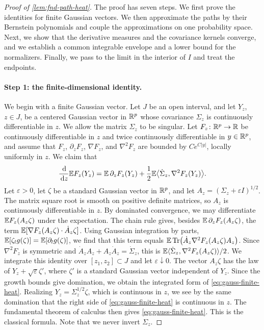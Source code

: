 \begin{proof}[Proof of \cref{lem:fnd-path-heat}]
The proof has seven steps. We first prove the identities for finite
Gaussian vectors. We then approximate the paths by their Bernstein
polynomials and couple the approximations on one probability space.
Next, we show that the derivative measures and the covariance kernels
converge, and we establish a common integrable envelope and a lower
bound for the normalizers. Finally, we pass to the limit in the interior
of $I$ and treat the endpoints.

\paragraph{Step 1: the finite-dimensional identity.}
We begin with a finite Gaussian vector. Let $J$ be an open interval,
and let $Y_z$, $z\in J$, be a centered Gaussian vector in $\mathbb R^p$ whose
covariance $\Sigma_z$ is continuously differentiable in $z$. We allow the
matrix $\Sigma_z$ to be
singular. Let $F_z\colon\mathbb R^p\to\mathbb R$ be continuously
differentiable in $z$ and twice continuously differentiable in
$y\in\mathbb R^p$, and assume that $F_z$, $\partial_zF_z$, $\nabla F_z$, and
$\nabla^2F_z$ are bounded by $Ce^{C|y|}$, locally uniformly in $z$. We
claim that
\begin{equation}\label{eq:gauss-finite-heat}
 \frac{\,\mathrm d}{\,\mathrm d z}\mathbb E F_z(Y_z)=\mathbb E\,\partial_zF_z(Y_z)
 +\frac12\mathbb E\bigl\langle\dot\Sigma_z,\nabla^2F_z(Y_z)\bigr\rangle .
\end{equation}
Let $\varepsilon>0$, let $\zeta$ be a standard Gaussian vector in
$\mathbb R^p$, and let $A_z=(\Sigma_z+\varepsilon I)^{1/2}$. The matrix square
root is smooth on positive definite matrices, so $A_z$ is continuously
differentiable in $z$. By dominated convergence, we may differentiate
$\mathbb E F_z(A_z\zeta)$ under the expectation. The chain rule gives, besides
$\mathbb E\,\partial_zF_z(A_z\zeta)$, the term
$\mathbb E[\nabla F_z(A_z\zeta)\cdot\dot A_z\zeta]$. Using Gaussian integration
by parts, $\mathbb E[\zeta_lg(\zeta)]=\mathbb E[\partial_lg(\zeta)]$, we find that
this term equals $\mathbb E\operatorname{Tr}\bigl(\dot A_z\nabla^2F_z(A_z\zeta)A_z\bigr)$.
Since $\nabla^2F_z$ is symmetric and
$\dot A_zA_z+A_z\dot A_z=\dot\Sigma_z$, this is
$\mathbb E\langle\dot\Sigma_z,\nabla^2F_z(A_z\zeta)\rangle/2$. We integrate
this identity over $[z_1,z_2]\subset J$ and let $\varepsilon\downarrow0$.
The vector $A_z\zeta$ has the law of $Y_z+\sqrt\varepsilon\zeta'$, where
$\zeta'$ is a standard Gaussian vector independent of $Y_z$. Since the
growth bounds give domination, we obtain
the integrated form of
\eqref{eq:gauss-finite-heat}. Realizing $Y_z=\Sigma_z^{1/2}\zeta$, which
is continuous in $z$, we see by the same domination that the right side
of \eqref{eq:gauss-finite-heat} is continuous in $z$. The fundamental
theorem of calculus then gives
\eqref{eq:gauss-finite-heat}. This is the classical formula. Note that we
never invert $\Sigma_z$.


\end{proof}
